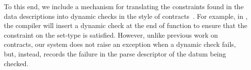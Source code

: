 To this end, we include a mechanism for translating the constraints
found in the data descriptions into dynamic checks in the style of
contracts~\cite{findler+:contracts}. For example, in
, the compiler will insert a dynamic check
at the end of function  to ensure that the constraint
on the set-type is satisfied. However, unlike previous work on
contracts, our system does not raise an exception when a dynamic check
fails, but, instead, records the failure in the parse descriptor of
the datum being checked.  


